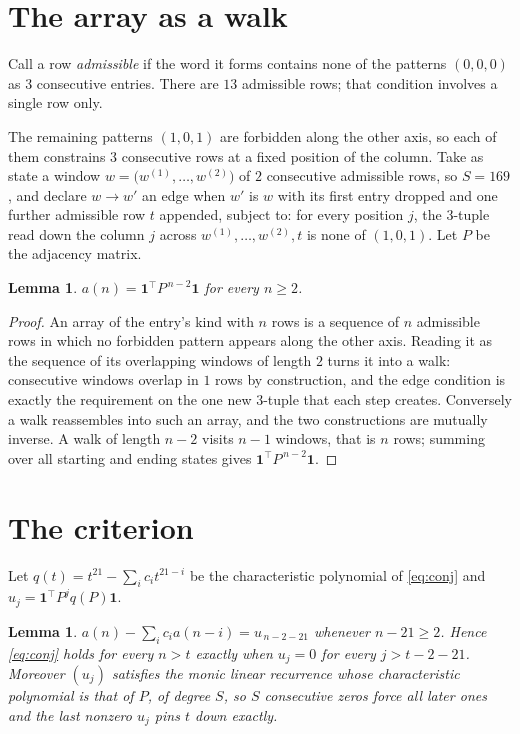 \documentclass[11pt,a4paper]{article}
\theoremstyle{plain}
\newtheorem{lemma}[theorem]{Lemma}
\theoremstyle{definition}
\begin{document}
\section{The array as a walk}

Call a row \emph{admissible} if the word it forms contains none of the patterns
$(0,0,0)$ as $3$ consecutive entries. There are $13$ admissible rows; that condition
involves a single row only.

The remaining patterns $(1,0,1)$ are forbidden along the other axis, so each of them
constrains $3$ consecutive rows at a fixed position of the column. Take as state a
window $w=\bigl(w^{(1)},\dots,w^{(2)}\bigr)$ of $2$ consecutive admissible
rows, so $S=169$, and declare $w\to w'$ an edge when $w'$ is $w$ with its first entry
dropped and one further admissible row $t$ appended, subject to: for every position
$j$, the $3$-tuple read down the column $j$ across $w^{(1)},\dots,w^{(2)},t$
is none of $(1,0,1)$. Let $P$ be the adjacency matrix.

\begin{lemma}\label{lem:walk}
$a(n)=\mathbf{1}^{\!\top}P^{\,n-2}\mathbf{1}$ for every $n\ge2$.
\end{lemma}

\begin{proof}
An array of the entry's kind with $n$ rows is a sequence of $n$ admissible rows in
which no forbidden pattern appears along the other axis. Reading it as the sequence of its
overlapping windows of length $2$ turns it into a walk: consecutive windows overlap in
$1$ rows by construction, and the edge condition is exactly the requirement on the one
new $3$-tuple that each step creates. Conversely a walk reassembles into such an array,
and the two constructions are mutually inverse. A walk of length $n-2$ visits $n-1$
windows, that is $n$ rows; summing over all starting and ending states gives
$\mathbf{1}^{\!\top}P^{\,n-2}\mathbf{1}$.
\end{proof}

\section{The criterion}

Let $q(t)=t^{21}-\sum_i c_i t^{21-i}$ be the characteristic polynomial of
\eqref{eq:conj} and $u_j=\mathbf{1}^{\!\top}P^{j}q(P)\mathbf{1}$.

\begin{lemma}\label{lem:crit}
$a(n)-\sum_i c_i a(n-i)=u_{\,n-2-21}$ whenever $n-21\ge2$. Hence
\eqref{eq:conj} holds for every $n>t$ exactly when $u_j=0$ for every
$j>t-2-21$. Moreover $(u_j)$ satisfies the monic linear recurrence whose
characteristic polynomial is that of $P$, of degree $S$, so $S$ consecutive zeros force all
later ones and the last nonzero $u_j$ pins $t$ down exactly.
\end{lemma}
\end{document}
